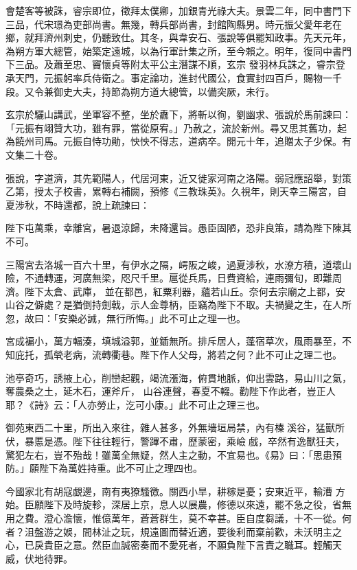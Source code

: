 \begin{pinyinscope}
 會楚客等被誅，睿宗即位，徵拜太僕卿，加銀青光祿大夫。景雲二年，同中書門下三品，代宋璟為吏部尚書。無幾，轉兵部尚書，封館陶縣男。時元振父愛年老在鄉，就拜濟州刺史，仍聽致仕。其冬，與韋安石、張說等俱罷知政事。先天元年，為朔方軍大總管，始築定遠城，以為行軍計集之所，至今賴之。明年，復同中書門下三品。及蕭至忠、竇懷貞等附太平公主潛謀不順，玄宗
 發羽林兵誅之，睿宗登承天門，元振躬率兵侍衛之。事定論功，進封代國公，食實封四百戶，賜物一千段。又令兼御史大夫，持節為朔方道大總管，以備突厥，未行。



 玄宗於驪山講武，坐軍容不整，坐於纛下，將斬以徇，劉幽求、張說於馬前諫曰：「元振有翊贊大功，雖有罪，當從原宥。」乃赦之，流於新州。尋又思其舊功，起為饒州司馬。元振自恃功勛，怏怏不得志，道病卒。開元十年，追贈太子少保。有文集二十卷。



 張說，字道濟，其先範陽人，代居河東，近又徙家河南之洛陽。弱冠應詔舉，對策乙第，授太子校書，累轉右補闕，預修《三教珠英》。久視年，則天幸三陽宮，自夏涉秋，不時還都，說上疏諫曰：



 陛下屯萬乘，幸離宮，暑退涼歸，未降還旨。愚臣固陋，恐非良策，請為陛下陳其不可。



 三陽宮去洛城一百六十里，有伊水之隔，崿阪之峻，過夏涉秋，水潦方積，道壞山險，不通轉運，河廣無梁，咫尺千里。扈從兵馬，日費資給，連雨彌旬，即難周濟。陛下太倉、武庫，
 並在都邑，紅粟利器，蘊若山丘。奈何去宗廟之上都，安山谷之僻處？是猶倒持劍戟，示人金尊柄，臣竊為陛下不取。夫禍變之生，在人所忽，故曰：「安樂必誡，無行所悔。」此不可止之理一也。



 宮成褊小，萬方輻湊，填城溢郭，並鍤無所。排斥居人，蓬宿草次，風雨暴至，不知庇托，孤煢老病，流轉衢巷。陛下作人父母，將若之何？此不可止之理二也。



 池亭奇巧，誘掖上心，削巒起觀，竭流漲海，俯貫地脈，仰出雲路，易山川之氣，奪農桑之土，延木石，運斧斤，
 山谷連聲，春夏不輟。勸陛下作此者，豈正人耶？《詩》云：「人亦勞止，汔可小康。」此不可止之理三也。



 御苑東西二十里，所出入來往，雜人甚多，外無墻垣局禁，內有榛溪谷，猛獸所伏，暴慝是憑。陛下往往輕行，警蹕不肅，歷蒙密，乘嶮戲，卒然有逸獸狂夫，驚犯左右，豈不殆哉！雖萬全無疑，然人主之動，不宜易也。《易》曰：「思患預防。」願陛下為萬姓持重。此不可止之理四也。



 今國家北有胡寇覷邊，南有夷獠騷徼。關西小旱，耕稼是憂；安東近平，輸漕
 方始。臣願陛下及時旋軫，深居上京，息人以展農，修德以來遠，罷不急之役，省無用之費。澄心澹懷，惟億萬年，蒼蒼群生，莫不幸甚。臣自度芻議，十不一從。何者？沮盤游之娛，間林沚之玩，規遠圖而替近適，要後利而棄前歡，未沃明主之心，已戾貴臣之意。然臣血誠密奏而不愛死者，不願負陛下言責之職耳。輕觸天威，伏地待罪。




\end{pinyinscope}
